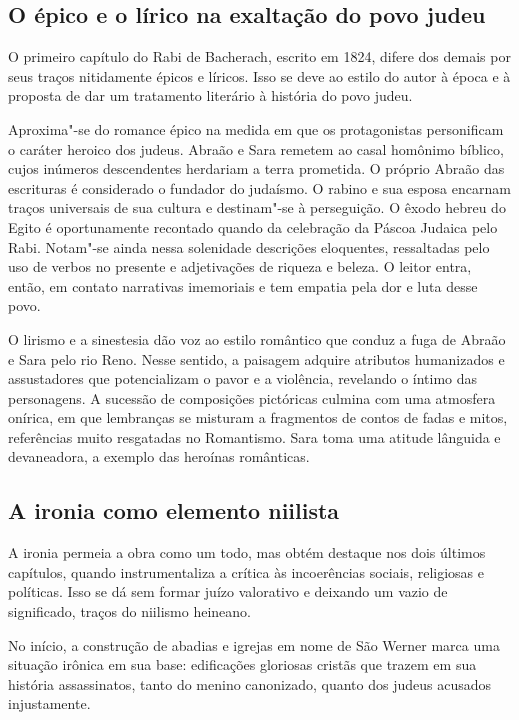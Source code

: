 \documentclass[12pt]{extarticle}
\begin{document}
\subsection{O épico e o lírico na exaltação do povo judeu}

O primeiro capítulo do Rabi de Bacherach, escrito em 1824, difere dos
demais por seus traços nitidamente épicos e líricos. Isso se deve ao
estilo do autor à época e à proposta de dar um tratamento literário à
história do povo judeu.

Aproxima"-se do romance épico na medida em que os protagonistas
personificam o caráter heroico dos judeus. Abraão e Sara remetem ao
casal homônimo bíblico, cujos inúmeros descendentes herdariam a terra
prometida. O próprio Abraão das escrituras é considerado o fundador do
judaísmo. O rabino e sua esposa encarnam traços universais de sua
cultura e destinam"-se à perseguição. O êxodo hebreu do Egito é
oportunamente recontado quando da celebração da Páscoa Judaica pelo
Rabi. Notam"-se ainda nessa solenidade descrições eloquentes, ressaltadas
pelo uso de verbos no presente e adjetivações de riqueza e beleza. O
leitor entra, então, em contato narrativas imemoriais e tem empatia pela
dor e luta desse povo.

O lirismo e a sinestesia dão voz ao estilo romântico que conduz a fuga
de Abraão e Sara pelo rio Reno. Nesse sentido, a paisagem adquire
atributos humanizados e assustadores que potencializam o pavor e a
violência, revelando o íntimo das personagens. A sucessão de composições
pictóricas culmina com uma atmosfera onírica, em que lembranças se
misturam a fragmentos de contos de fadas e mitos, referências muito
resgatadas no Romantismo. Sara toma uma atitude lânguida e devaneadora,
a exemplo das heroínas românticas.

\subsection{A ironia como elemento niilista}

A ironia permeia a obra como um todo, mas obtém destaque nos dois
últimos capítulos, quando instrumentaliza a crítica às incoerências
sociais, religiosas e políticas. Isso se dá sem formar juízo valorativo
e deixando um vazio de significado, traços do niilismo heineano.

No início, a construção de abadias e igrejas em nome de São Werner marca
uma situação irônica em sua base: edificações gloriosas cristãs que
trazem em sua história assassinatos, tanto do menino canonizado, quanto
dos judeus acusados injustamente.
\end{document}
